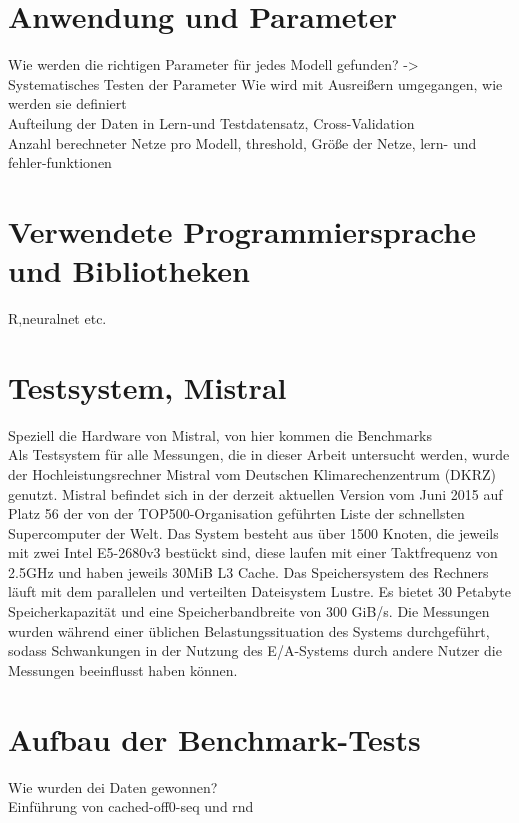 \documentclass[
	12pt,
	a4paper,
	BCOR10mm,
	DIV14,
	listof=totoc,
	bibliography=totoc,
	headsepline
]{scrreprt}
\begin{document}
\section{Anwendung und Parameter}
Wie werden die richtigen Parameter für jedes Modell gefunden? -> Systematisches Testen der Parameter
Wie wird mit Ausreißern umgegangen, wie werden sie definiert\\
Aufteilung der Daten in Lern-und Testdatensatz, Cross-Validation\\ 
Anzahl berechneter Netze pro Modell, threshold, Größe der Netze, lern- und fehler-funktionen\\

\section{Verwendete Programmiersprache und Bibliotheken}
R,neuralnet etc.

\section{Testsystem, Mistral}
\label{impl:testsystem}
Speziell die Hardware von Mistral, von hier kommen die Benchmarks\\

Als Testsystem für alle Messungen, die in dieser Arbeit untersucht werden, wurde der Hochleistungsrechner Mistral vom Deutschen Klimarechenzentrum (DKRZ) genutzt. Mistral befindet sich in der derzeit aktuellen Version vom Juni 2015 auf Platz 56 der von der TOP500-Organisation geführten Liste der schnellsten Supercomputer der Welt. Das System besteht aus über 1500 Knoten, die jeweils mit zwei Intel E5-2680v3 bestückt sind, diese laufen mit einer Taktfrequenz von 2.5GHz und haben jeweils 30MiB L3 Cache. Das Speichersystem des Rechners läuft mit dem parallelen und verteilten Dateisystem Lustre. Es bietet 30 Petabyte Speicherkapazität und eine Speicherbandbreite von 300 GiB/s. Die Messungen wurden während einer üblichen Belastungssituation des Systems durchgeführt, sodass Schwankungen in der Nutzung des E/A-Systems durch andere Nutzer die Messungen beeinflusst haben können.

\section{Aufbau der Benchmark-Tests}
Wie wurden dei Daten gewonnen?\\
Einführung von cached-off0-seq und rnd\\
\end{document}
